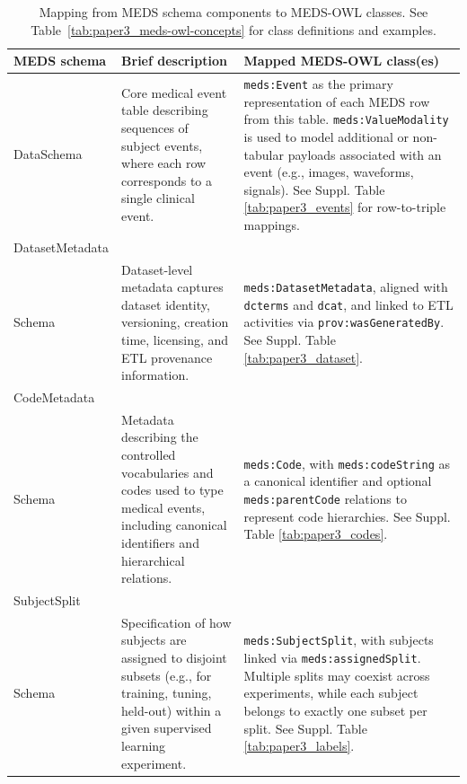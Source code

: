 \begin{table}[htbp]
	\centering
	\footnotesize
	\caption{Mapping from MEDS schema components to MEDS-OWL classes. See Table~\ref{tab:paper3_meds-owl-concepts} for class definitions and examples.}
	\label{tab:paper3_schema-to-ontology}
\begin{tabularx}{\textwidth}{>{\raggedright\arraybackslash}p{} >{\raggedright\arraybackslash}X >{\raggedright\arraybackslash}X}
		\toprule
		\textbf{MEDS schema} & \textbf{Brief description} & \textbf{Mapped MEDS-OWL class(es)} \\
		\midrule
		DataSchema &
		Core medical event table describing sequences of subject events, where each row corresponds to a single clinical event. &
		\texttt{meds:Event} as the primary representation of each MEDS row from this table.  
		\texttt{meds:ValueModality} is used to model additional or non-tabular payloads associated with an event (e.g., images, waveforms, signals).  
		See Suppl. Table \ref{tab:paper3_events} for row-to-triple mappings. \\[4pt]%
		
		Dataset\allowbreak Metadata \\ Schema &
		Dataset-level metadata captures dataset identity, versioning, creation time, licensing, and ETL provenance information. &
		\texttt{meds:DatasetMetadata}, aligned with \texttt{dcterms} and \texttt{dcat}, and linked to ETL activities via \texttt{prov:wasGeneratedBy}.  
		See Suppl. Table \ref{tab:paper3_dataset}. \\[4pt] %
		
		Code\allowbreak Metadata \\ Schema &
		Metadata describing the controlled vocabularies and codes used to type medical events, including canonical identifiers and hierarchical relations. &
		\texttt{meds:Code}, with \texttt{meds:codeString} as a canonical identifier and optional \texttt{meds:parentCode} relations to represent code hierarchies.  
		See Suppl. Table \ref{tab:paper3_codes}. \\[4pt] %
		
		SubjectSplit \\ Schema &
		Specification of how subjects are assigned to disjoint subsets (e.g., for training, tuning, held-out) within a given supervised learning experiment. &
		\texttt{meds:SubjectSplit}, with subjects linked via \texttt{meds:assignedSplit}.  
		Multiple splits may coexist across experiments, while each subject belongs to exactly one subset per split.  
		See Suppl. Table \ref{tab:paper3_labels}. \\[4pt]%
		

\end{tabularx}
\end{table}
